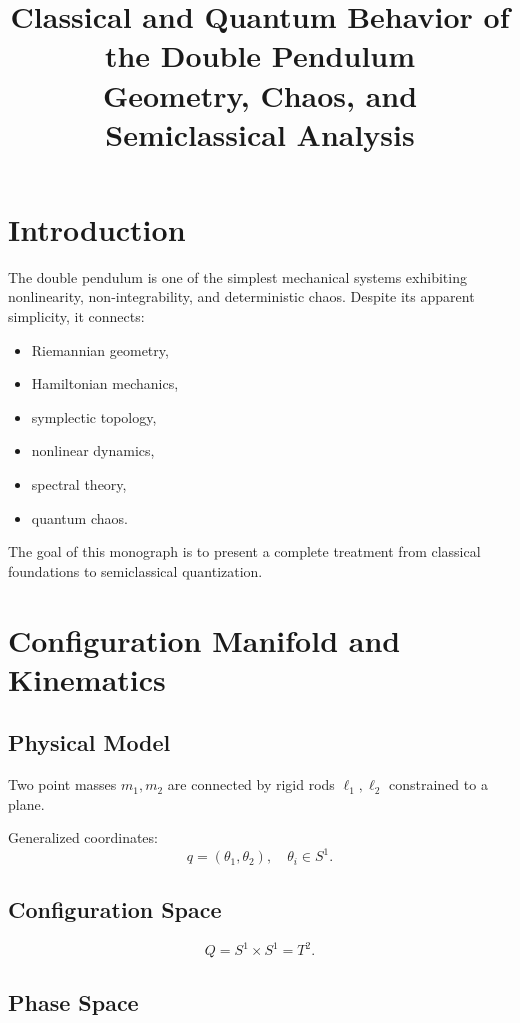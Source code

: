 \documentclass[11pt,oneside]{book}
\title{Classical and Quantum Behavior of the Double Pendulum\\
\large Geometry, Chaos, and Semiclassical Analysis}
\author{}
\date{}
\begin{document}
\frontmatter
\maketitle
\tableofcontents

\mainmatter

\chapter{Introduction}

The double pendulum is one of the simplest mechanical systems exhibiting
nonlinearity, non-integrability, and deterministic chaos.
Despite its apparent simplicity, it connects:

\begin{itemize}
\item Riemannian geometry,
\item Hamiltonian mechanics,
\item symplectic topology,
\item nonlinear dynamics,
\item spectral theory,
\item quantum chaos.
\end{itemize}

The goal of this monograph is to present a complete treatment
from classical foundations to semiclassical quantization.

\chapter{Configuration Manifold and Kinematics}

\section{Physical Model}

Two point masses $m_1,m_2$ are connected by rigid rods
$\ell_1,\ell_2$ constrained to a plane.

Generalized coordinates:
\[
q=(\theta_1,\theta_2), \quad \theta_i\in S^1.
\]

\section{Configuration Space}

\[
Q=S^1\times S^1 = T^2.
\]

\section{Phase Space}
\end{document}
